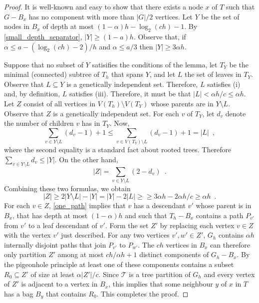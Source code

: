 \documentclass{patmorin}
\begin{document}


\begin{proof}
  It is well-known and easy to show that there exists a node $x$ of $T$ such that $G-B_x$ has no component with more than $|G|/2$ vertices.  Let $Y$ be the set of nodes in $B_x$ of depth at most $(1-\alpha)h-\log_2(ch)-1$. By \cref{small_depth_separator}, $|Y|\ge (1-a)h$.  Observe that, if $\alpha \le a-(\log_2(ch)-2)/h$ and $\alpha \le a/3$ then $|Y|\ge 3\alpha h$.

  Suppose that no subset of $Y$ satisifies the conditions of the lemma, let $T_Y$ be the minimal (connected) subtree of $T_h$ that spans $Y$, and let $L$ the set of leaves in $T_Y$.  Observe that $L\subseteq Y$ is a genetically independent set. Therefore, $L$ satisfies (i) and, by definition, $L$ satisfies (iii).  Therefore, it must be that $|L|<\alpha h/c\le\alpha h$.  Let $Z$ consist of all vertices in $V(T_h)\setminus V(T_Y)$ whose parents are in $Y\setminus L$.   Observe that $Z$ is a genetically independent set. For each $v$ of $T_Y$, let $d_v$ denote the number of children $v$ has in $T_Y$.  Now,
  \[
     \sum_{v\in Y\setminus L} (d_v-1) + 1 
     \le \sum_{v\in V(T_Y)\setminus L} (d_v-1)+1
     = |L| \enspace ,
  \]
  where the second equality is a standard fact about rooted trees.
  Therefore $\sum_{v\in Y\setminus L} {d_v} \le |Y|$.  On the other hand,
  \[
    |Z| = \sum_{v\in Y\setminus L} (2-d_v) \enspace .
  \]
  Combining these two formulas, we obtain
  \[
    |Z| \ge 2|Y\setminus L| - |Y| = |Y| - 2|L| \ge 
    \ge 3\alpha h - 2\alpha h/c \ge \alpha h \enspace .
  \]
  For each $v\in Z$, \cref{one_path} implies that $v$ has a descendant $v'$ whose parent is in $B_x$, that has depth at most $(1-\alpha)h$ and such that $T_h-B_x$ contains a path $P_{v'}$ from $v'$ to a leaf descendant of $v'$.  Form the set $Z'$ by replacing each vertex $v\in Z$ with the vertex $v'$ just described.  For any two vertices $v',w'\in Z'$, $G_h$ contains $\alpha h$ internally disjoint paths that join $P_{v'}$ to $P_{w'}$.  The $ch$ vertices in $B_x$ can therefore only partition $Z'$ among at most $ch/\alpha h+1$ distinct components of $G_h-B_x$.  By the pigeonhole principle at least one of these components contains a subset $R_0\subseteq Z'$ of size at least $\alpha|Z'|/c$. Since $\mathcal{T}$ is a tree partition of $G_h$ and every vertex of $Z'$ is adjacent to a vertex in $B_x$, this implies that some neighbour $y$ of $x$ in $T$ has a bag $B_y$ that contains $R_0$.  This completes the proof.
\end{proof}
\end{document}
